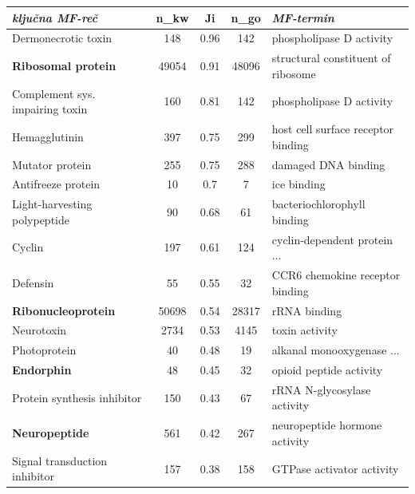 \documentclass{beamer}
\newcommand{\keyword}[1]{\textbf{#1}}
\begin{document}
\begin{frame}

  \hspace*{-0.4cm}
  \scriptsize
  \begin{tabular}{|p{4.2cm}|c|c|c|p{4.3cm}|}
    \hline
    \bf \textit{ključna MF-reč } & \bf n\_kw & \bf Ji & \bf n\_go & \bf \textit{MF-termin} \\
    \hline
    \hline
    Dermonecrotic toxin                & 148   & 0.96  & 142   & phospholipase D activity \\ \hline
    \keyword{Ribosomal protein}        & 49054 & 0.91  & 48096 & structural constituent of ribosome \\ \hline
    Complement sys. impairing toxin & 160   & 0.81  & 142   & phospholipase D activity \\ \hline
    Hemagglutinin                      & 397   & 0.75  & 299   & host cell surface receptor binding \\ \hline
    Mutator protein                    & 255   & 0.75  & 288   & damaged DNA binding \\ \hline
    Antifreeze protein                 & 10    & 0.7   & 7     & ice binding \\ \hline
    Light-harvesting polypeptide       & 90    & 0.68  & 61    & bacteriochlorophyll binding \\ \hline
    Cyclin                             & 197   & 0.61  & 124   & cyclin-dependent protein ... \\ \hline
    Defensin                           & 55    & 0.55  & 32    & CCR6 chemokine receptor binding \\ \hline
    \keyword{Ribonucleoprotein}        & 50698 & 0.54  & 28317 & rRNA binding \\ \hline
    Neurotoxin                         & 2734  & 0.53  & 4145  & toxin activity \\ \hline
    Photoprotein                       & 40    & 0.48  & 19    & alkanal monooxygenase ... \\ \hline
    \keyword{Endorphin}                & 48    & 0.45  & 32    & opioid peptide activity \\ \hline
    Protein synthesis inhibitor        & 150   & 0.43  & 67    & rRNA N-glycosylase activity \\ \hline
    \keyword{Neuropeptide}             & 561   & 0.42  & 267   & neuropeptide hormone activity \\ \hline
    Signal transduction inhibitor      & 157   & 0.38  & 158   & GTPase activator activity \\ \hline

\end{tabular}
\end{frame}
\end{document}
